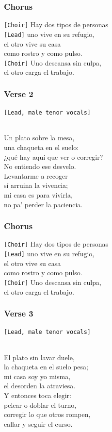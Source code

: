 \subsubsection{Chorus}\label{chorus-70}

\texttt{{[}Choir{]}} Hay dos tipos de personas\\
\texttt{{[}Lead{]}} uno vive en su refugio,\\
el otro vive su casa\\
como rostro y como pulso.\\
\texttt{{[}Choir{]}} Uno descansa sin culpa,\\
el otro carga el trabajo.

\subsubsection{Verse 2}\label{verse-2-27}

\texttt{{[}Lead,\ male\ tenor\ vocals{]}}\strut \\
Un plato sobre la mesa,\\
una chaqueta en el suelo:\\
¿qué hay aquí que ver o corregir?\\
No entiendo ese desvelo.\\
Levantarme a recoger\\
sí arruina la vivencia;\\
mi casa es para vivirla,\\
no pa' perder la paciencia.

\subsubsection{Chorus}\label{chorus-71}

\texttt{{[}Choir{]}} Hay dos tipos de personas\\
\texttt{{[}Lead{]}} uno vive en su refugio,\\
el otro vive su casa\\
como rostro y como pulso.\\
\texttt{{[}Choir{]}} Uno descansa sin culpa,\\
el otro carga el trabajo.

\subsubsection{Verse 3}\label{verse-3-13}

\texttt{{[}Lead,\ male\ tenor\ vocals{]}}\strut \\
El plato sin lavar duele,\\
la chaqueta en el suelo pesa;\\
mi casa soy yo misma,\\
el desorden la atraviesa.\\
Y entonces toca elegir:\\
pelear o doblar el turno,\\
corregir lo que otros rompen,\\
callar y seguir el curso.

